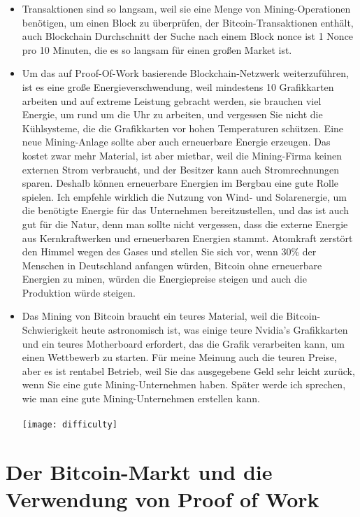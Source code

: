 \documentclass[ngerman]{scrreprt}
\begin{document}
\begin{itemize}
	\item Transaktionen sind so langsam, weil sie eine Menge von Mining-Operationen benötigen, um einen Block zu überprüfen, der Bitcoin-Transaktionen enthält, auch Blockchain Durchschnitt der Suche nach einem Block nonce ist 1 Nonce pro 10 Minuten, die es so langsam für einen großen Market ist.
	
	\item Um das auf Proof-Of-Work basierende Blockchain-Netzwerk weiterzuführen, ist es eine große Energieverschwendung, weil mindestens 10 Grafikkarten arbeiten und auf extreme Leistung gebracht werden, sie brauchen viel Energie, um rund um die Uhr zu arbeiten, und vergessen Sie nicht die Kühlsysteme, die die Grafikkarten vor hohen Temperaturen schützen. Eine neue Mining-Anlage sollte aber auch erneuerbare Energie erzeugen. Das kostet zwar mehr Material, ist aber mietbar, weil die Mining-Firma keinen externen Strom verbraucht, und der Besitzer kann auch Stromrechnungen sparen. Deshalb können erneuerbare Energien im Bergbau eine gute Rolle spielen. Ich empfehle wirklich die Nutzung von Wind- und Solarenergie, um die benötigte Energie für das Unternehmen bereitzustellen, und das ist auch gut für die Natur, denn man sollte nicht vergessen, dass die externe Energie aus Kernkraftwerken und erneuerbaren Energien stammt. Atomkraft zerstört den Himmel wegen des Gases und stellen Sie sich vor, wenn 30\% der Menschen in Deutschland anfangen würden, Bitcoin ohne erneuerbare Energien zu minen, würden die Energiepreise steigen und auch die Produktion würde steigen. 
	
	\item Das Mining von Bitcoin braucht ein teures Material, weil die Bitcoin-Schwierigkeit heute astronomisch ist, was einige teure Nvidia's Grafikkarten und ein teures Motherboard erfordert, das die Grafik verarbeiten kann, um einen Wettbewerb zu starten. Für meine Meinung auch die teuren Preise, aber es ist rentabel Betrieb, weil Sie das ausgegebene Geld sehr leicht zurück, wenn Sie eine gute Mining-Unternehmen haben. Später werde ich sprechen, wie man eine gute Mining-Unternehmen erstellen kann. \\ \\
	
	\texttt{[image: difficulty]}
\end{itemize}


\chapter{Der Bitcoin-Markt und die Verwendung von Proof of Work}
\end{document}
